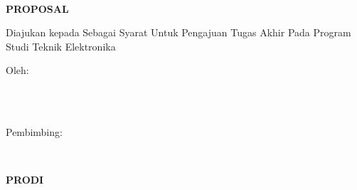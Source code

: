 
\newpage
{}
\begin{center}
    \begin{doublespace}
        \textbf{\large{\MakeUppercase{\judulid}}}\\[2.5cm]
    \end{doublespace}

    \textbf{\MakeUppercase{\large{Proposal \tipe}}}\\[0.5cm]
    \begin{onehalfspace}
        Diajukan kepada {\fakultas} {\universitas} Sebagai Syarat Untuk Pengajuan Tugas Akhir Pada Program Studi Teknik Elektronika\\[1.8cm]
    \end{onehalfspace}

    \large Oleh: \\
    \begin{onehalfspace}
        \large{\penulis} \\
        \large{\nim}\\[1.5cm]
    \end{onehalfspace}
    \vspace{1.5cm}

    \large Pembimbing: \\
    \begin{onehalfspace}
        \large{\pembimbing} \\
    \end{onehalfspace}

    \vfill

    \textbf{\large \MakeUppercase{Prodi \prodi}}\\
    \textbf{\large \MakeUppercase{\fakultas}}\\
    \textbf{\large \MakeUppercase{\universitas}}\\
    \textbf{\large \the\year{}}\\
\end{center}
